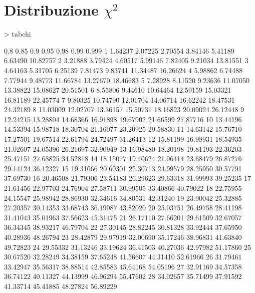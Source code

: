 \documentclass[onecolumn,12pt]{book}
\begin{document}
\section*{Distribuzione $\chi^2$}
\oddsidemargin 0.0in
\evensidemargin 0.0in
\topmargin -0.4in
\small
\begin{Schunk}
\begin{Sinput}
> tabchi
\end{Sinput}
\begin{Soutput}
          0.8      0.85       0.9      0.95      0.98      0.99     0.999
1     1.64237   2.07225   2.70554   3.84146   5.41189   6.63490  10.82757
2     3.21888   3.79424   4.60517   5.99146   7.82405   9.21034  13.81551
3     4.64163   5.31705   6.25139   7.81473   9.83741  11.34487  16.26624
4     5.98862   6.74488   7.77944   9.48773  11.66784  13.27670  18.46683
5     7.28928   8.11520   9.23636  11.07050  13.38822  15.08627  20.51501
6     8.55806   9.44610  10.64464  12.59159  15.03321  16.81189  22.45774
7     9.80325  10.74790  12.01704  14.06714  16.62242  18.47531  24.32189
8    11.03009  12.02707  13.36157  15.50731  18.16823  20.09024  26.12448
9    12.24215  13.28804  14.68366  16.91898  19.67902  21.66599  27.87716
10   13.44196  14.53394  15.98718  18.30704  21.16077  23.20925  29.58830
11   14.63142  15.76710  17.27501  19.67514  22.61794  24.72497  31.26413
12   15.81199  16.98931  18.54935  21.02607  24.05396  26.21697  32.90949
13   16.98480  18.20198  19.81193  22.36203  25.47151  27.68825  34.52818
14   18.15077  19.40624  21.06414  23.68479  26.87276  29.14124  36.12327
15   19.31066  20.60301  22.30713  24.99579  28.25950  30.57791  37.69730
16   20.46508  21.79306  23.54183  26.29623  29.63318  31.99993  39.25235
17   21.61456  22.97703  24.76904  27.58711  30.99505  33.40866  40.79022
18   22.75955  24.15547  25.98942  28.86930  32.34616  34.80531  42.31240
19   23.90042  25.32885  27.20357  30.14353  33.68743  36.19087  43.82020
20   25.03751  26.49758  28.41198  31.41043  35.01963  37.56623  45.31475
21   26.17110  27.66201  29.61509  32.67057  36.34345  38.93217  46.79704
22   27.30145  28.82245  30.81328  33.92444  37.65950  40.28936  48.26794
23   28.42879  29.97919  32.00690  35.17246  38.96831  41.63840  49.72823
24   29.55332  31.13246  33.19624  36.41503  40.27036  42.97982  51.17860
25   30.67520  32.28249  34.38159  37.65248  41.56607  44.31410  52.61966
26   31.79461  33.42947  35.56317  38.88514  42.85583  45.64168  54.05196
27   32.91169  34.57358  36.74122  40.11327  44.13999  46.96294  55.47602
28   34.02657  35.71499  37.91592  41.33714  45.41885  48.27824  56.89229

\end{Soutput}
\end{Schunk}
\end{document}
